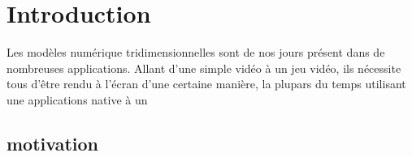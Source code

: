 \chapter*{Introduction}

Les modèles numérique tridimensionnelles sont de nos jours présent dans de
nombreuses applications. Allant d'une simple vidéo à un jeu vidéo, ils nécessite
tous d'être rendu à l'écran d'une certaine manière, la plupars du temps
utilisant une applications native à un

\section*{motivation}


